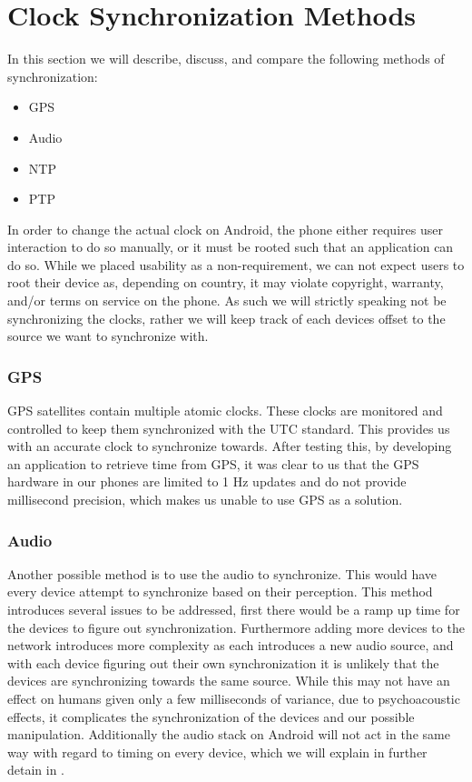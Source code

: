 \section{Clock Synchronization Methods}
In this section we will describe, discuss, and compare the following methods of synchronization:
\begin{multicols}{2}
    \begin{itemize}
        \item GPS
        \item Audio
        \item \ac{NTP}
        \item \ac{PTP}
    \end{itemize}
\end{multicols}
In order to change the actual clock on Android, the phone either requires user interaction to do so manually, or it must be rooted such that an application can do so.
While we placed usability as a non-requirement, we can not expect users to root their device as, depending on country, it may violate copyright, warranty, and/or terms on service on the phone.
As such we will strictly speaking not be synchronizing the clocks, rather we will keep track of each devices offset to the source we want to synchronize with.

\subsubsection{GPS}
GPS satellites contain multiple atomic clocks.
These clocks are monitored and controlled to keep them synchronized with the UTC standard.
This provides us with an accurate clock to synchronize towards.\cite{gpsclock}
After testing this, by developing an application to retrieve time from GPS, it was clear to us that the GPS hardware in our phones are limited to 1 Hz updates and do not provide millisecond precision, which makes us unable to use GPS as a solution.

\subsubsection{Audio}
Another possible method is to use the audio to synchronize.
This would have every device attempt to synchronize based on their perception.
This method introduces several issues to be addressed, first there would be a ramp up time for the devices to figure out synchronization.
Furthermore adding more devices to the network introduces more complexity as each introduces a new audio source, and with each device figuring out their own synchronization it is unlikely that the devices are synchronizing towards the same source.
While this may not have an effect on humans given only a few milliseconds of variance, due to psychoacoustic effects, it complicates the synchronization of the devices and our possible manipulation.
Additionally the audio stack on Android will not act in the same way with regard to timing on every device, which we will explain in further detain in .

